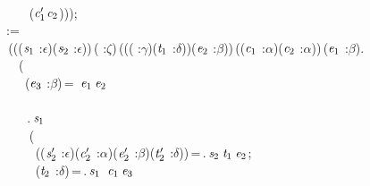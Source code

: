 \,\,\,\,\,\,\,\,\,\,\,\,\\
\,\,\,\,\,\,\,\,\,\,\,\,\,\,(\ensuremath{\HOLBoundVar{c}\sb{\mathrm{1}}\sp{\prime{}}}\HOLSymConst{,}\ensuremath{\HOLBoundVar{c}\sb{\mathrm{2}}})));\\
\,\,\,:=\\
\,\,\,\,(\HOLTokenLambda{}((\ensuremath{\HOLBoundVar{s}\sb{\mathrm{1}}} :\ensuremath{\epsilon})\HOLSymConst{,}(\ensuremath{\HOLBoundVar{s}\sb{\mathrm{2}}} :\ensuremath{\epsilon}))\,( :\ensuremath{\zeta})\,((( :\ensuremath{\gamma})\HOLSymConst{,}(\ensuremath{\HOLBoundVar{t}\sb{\mathrm{1}}} :\ensuremath{\delta}))\HOLSymConst{,}(\ensuremath{\HOLBoundVar{e}\sb{\mathrm{2}}} :\ensuremath{\beta}))\,((\ensuremath{\HOLBoundVar{c}\sb{\mathrm{1}}} :\ensuremath{\alpha})\HOLSymConst{,}(\ensuremath{\HOLBoundVar{c}\sb{\mathrm{2}}} :\ensuremath{\alpha}))\,(\ensuremath{\HOLBoundVar{e}\sb{\mathrm{1}}} :\ensuremath{\beta}).\\
\,\,\,\,\,\,\,\,\,(\\
\,\,\,\,\,\,\,\,\,\,\,\,(\ensuremath{\HOLBoundVar{e}\sb{\mathrm{3}}} :\ensuremath{\beta})\,=\,\,\,\ensuremath{\HOLBoundVar{e}\sb{\mathrm{1}}}\,\ensuremath{\HOLBoundVar{e}\sb{\mathrm{2}}}\\
\,\,\,\,\,\,\,\,\,\,\\
\,\,\,\,\,\,\,\,\,\,\,\,\,.\,\ensuremath{\HOLBoundVar{s}\sb{\mathrm{1}}}\,\,\\
\,\,\,\,\,\,\,\,\,\,\,\,\,\,(\\
\,\,\,\,\,\,\,\,\,\,\,\,\,\,\,\,\,((\ensuremath{\HOLBoundVar{s}\sb{\mathrm{2}}\sp{\prime{}}} :\ensuremath{\epsilon})\HOLSymConst{,}(\ensuremath{\HOLBoundVar{c}\sb{\mathrm{2}}\sp{\prime{}}} :\ensuremath{\alpha})\HOLSymConst{,}(\ensuremath{\HOLBoundVar{e}\sb{\mathrm{2}}\sp{\prime{}}} :\ensuremath{\beta})\HOLSymConst{,}(\ensuremath{\HOLBoundVar{t}\sb{\mathrm{2}}\sp{\prime{}}} :\ensuremath{\delta}))\,=\,.\,\ensuremath{\HOLBoundVar{s}\sb{\mathrm{2}}}\,\ensuremath{\HOLBoundVar{t}\sb{\mathrm{1}}}\,\ensuremath{\HOLBoundVar{e}\sb{\mathrm{2}}};\\
\,\,\,\,\,\,\,\,\,\,\,\,\,\,\,\,\,(\ensuremath{\HOLBoundVar{t}\sb{\mathrm{2}}} :\ensuremath{\delta})\,=\,.\,\ensuremath{\HOLBoundVar{s}\sb{\mathrm{1}}}\,\,\,\ensuremath{\HOLBoundVar{c}\sb{\mathrm{1}}}\,\ensuremath{\HOLBoundVar{e}\sb{\mathrm{3}}}\\
